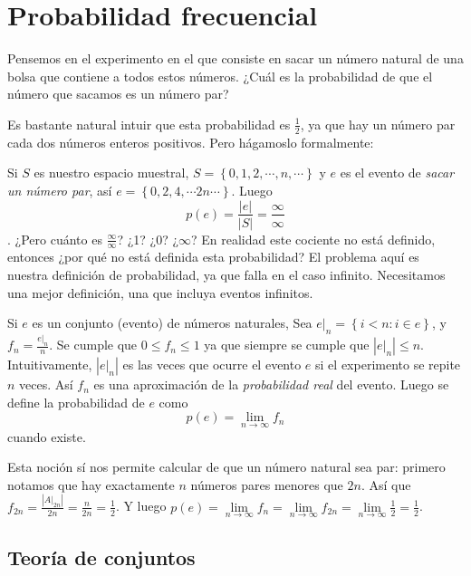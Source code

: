 \documentclass[spanish]{report}
\newcommand{\card}[1]{\left|#1 \right|}
\begin{document}
\section{Probabilidad frecuencial}

Pensemos en el experimento en el que consiste en sacar un número natural de una bolsa que contiene a todos estos números. ¿Cuál es la probabilidad de que el número que sacamos es un número par?

Es bastante natural intuir que esta probabilidad es $\frac{1}{2}$, ya que hay un número par cada dos números enteros positivos. Pero hágamoslo formalmente:

Si $S$ es nuestro espacio muestral, $S= \left\lbrace 0, 1, 2, \cdots, n, \cdots \right\rbrace$ y $e$ es el evento de \emph{sacar un número par}, así $e= \left\lbrace 0, 2, 4, \cdots 2n \cdots \right\rbrace$. Luego \[p(e) = \frac{\card{e}}{\card{S}} = \frac{\infty}{\infty} \].
¿Pero cuánto es $\frac{\infty}{\infty}$? ¿1? ¿0? ¿$\infty$?
En realidad este cociente no está definido, entonces ¿por qué no está definida esta probabilidad? El problema aquí es nuestra definición de probabilidad, %
ya que falla en el caso infinito. Necesitamos una mejor definición, una que incluya eventos infinitos.

Si $e$ es un conjunto (evento) de números naturales, Sea $e|_n = \left\lbrace i < n : i \in e \right\rbrace$, y $f_n = \frac{e|_n}{n}$. Se cumple que $0 \leq f_n \leq 1$ ya que siempre se cumple que $\card{e|_n} \leq n$.
Intuitivamente, $\card{e|_n}$ es las veces que ocurre el evento $e$ si el experimento se repite $n$ veces. Así $f_n$ es una aproximación de la \emph{probabilidad real} del evento.
Luego se define la probabilidad de $e$ como \[p(e) = \lim\limits_{n \to \infty} f_n\] cuando existe.

Esta noción sí nos permite calcular de que un número natural sea par:
primero notamos que hay exactamente $n$ números pares menores que $2n$. Así que $f_{2n}= \frac{\card{A|_{2n}}}{2n}=\frac{n}{2n}=\frac{1}{2}$.
Y luego $p(e) = \lim\limits_{n \to \infty} f_n = \lim\limits_{n \to \infty} f_{2n}= \lim\limits_{n \to \infty}\frac{1}{2} = \frac{1}{2}$.

\subsection{Teoría de conjuntos}
\end{document}
